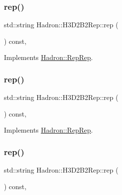 \subsubsection{\texorpdfstring{rep()}{rep()}\hspace{0.1cm}{\footnotesize\ttfamily [2/5]}}
{\footnotesize\ttfamily std\+::string Hadron\+::\+H3\+D2\+B2\+Rep\+::rep (\begin{DoxyParamCaption}{ }\end{DoxyParamCaption}) const\hspace{0.3cm}{\ttfamily [inline]}, {\ttfamily [virtual]}}



Implements \mbox{\hyperlink{structHadron_1_1RepRep_ab3213025f6de249f7095892109575fde}{Hadron\+::\+Rep\+Rep}}.

\mbox{\label{structHadron_1_1H3D2B2Rep_af5ed865d7a3f08904144cb23f152ecb5}} 
\subsubsection{\texorpdfstring{rep()}{rep()}\hspace{0.1cm}{\footnotesize\ttfamily [3/5]}}
{\footnotesize\ttfamily std\+::string Hadron\+::\+H3\+D2\+B2\+Rep\+::rep (\begin{DoxyParamCaption}{ }\end{DoxyParamCaption}) const\hspace{0.3cm}{\ttfamily [inline]}, {\ttfamily [virtual]}}



Implements \mbox{\hyperlink{structHadron_1_1RepRep_ab3213025f6de249f7095892109575fde}{Hadron\+::\+Rep\+Rep}}.

\mbox{\label{structHadron_1_1H3D2B2Rep_af5ed865d7a3f08904144cb23f152ecb5}} 
\subsubsection{\texorpdfstring{rep()}{rep()}\hspace{0.1cm}{\footnotesize\ttfamily [4/5]}}
{\footnotesize\ttfamily std\+::string Hadron\+::\+H3\+D2\+B2\+Rep\+::rep (\begin{DoxyParamCaption}{ }\end{DoxyParamCaption}) const\hspace{0.3cm}{\ttfamily [inline]}, {\ttfamily [virtual]}}



